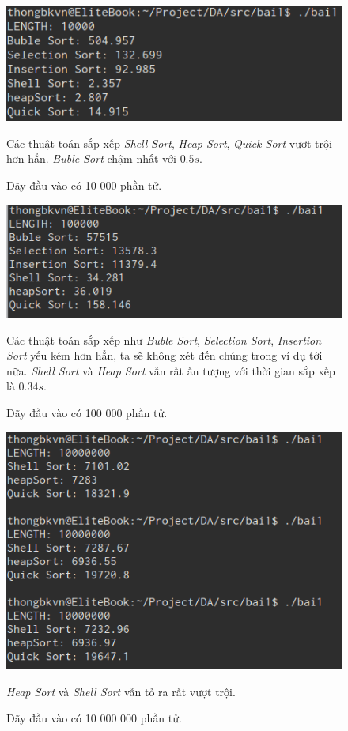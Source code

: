 \documentclass[a4paper,12pt]{report}
\begin{document}
\begin{figure}[htp]
\begin{center}
\includegraphics[scale=0.50]{img/bai1_10000.png}
\caption{Dãy đầu vào có 10 000 phần tử.}
\label{}
\end{center}
Các thuật toán sắp xếp \emph{Shell Sort}, \emph{Heap Sort}, \emph{Quick Sort} vượt trội hơn hẳn. \emph{Buble Sort} chậm nhất với $0.5s$.
\end{figure}

\begin{figure}[htp]
\begin{center}
\includegraphics[scale=0.50]{img/bai1_100000.png}
\caption{Dãy đầu vào có 100 000 phần tử.}
\label{}
\end{center}
Các thuật toán sắp xếp như \emph{Buble Sort}, \emph{Selection Sort}, \emph{Insertion Sort} yếu kém hơn hẳn, ta sẽ không xét đến chúng trong ví dụ tới nữa. \emph{Shell Sort} và \emph{Heap Sort} vẫn rất ấn tượng với thời gian sắp xếp là $0.34s$.
\end{figure}

\begin{figure}[htp]
\begin{center}
\includegraphics[scale=0.50]{img/bai1_10000000.png}
\caption{Dãy đầu vào có 10 000 000 phần tử.}
\label{}
\end{center}
\emph{Heap Sort} và \emph{Shell Sort} vẫn tỏ ra rất vượt trội.
\end{figure}
\newpage
\end{document}

